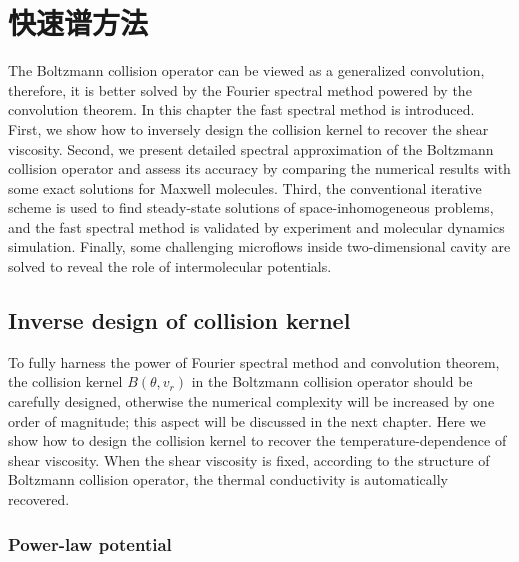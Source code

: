 \chapter{快速谱方法}
\label{chap:single_component}

The Boltzmann collision operator can be viewed as a generalized convolution, therefore, it is better solved by the Fourier spectral method powered by the convolution theorem. In this chapter the fast spectral method is introduced. First, we show how to inversely design the collision kernel to recover the shear viscosity. Second, we present detailed spectral approximation of the Boltzmann collision operator and assess its accuracy by comparing the numerical results with some exact solutions for Maxwell molecules. Third, the conventional iterative scheme is used to find steady-state solutions of space-inhomogeneous problems, and the fast spectral method is validated by experiment and molecular dynamics simulation. Finally, some challenging microflows inside two-dimensional cavity are solved to reveal the role of intermolecular potentials.



\section{Inverse design of collision kernel}
\label{collision_kernel_detailed}

To fully harness the power of Fourier spectral method and convolution theorem, the collision kernel $B(\theta,v_r)$ in the Boltzmann collision operator should be carefully designed, otherwise the numerical complexity will be increased by one order of magnitude; this aspect will be discussed in the next chapter. Here we show how to design the collision kernel to recover the temperature-dependence of shear viscosity. When the shear viscosity is fixed, according to the structure of Boltzmann collision operator, the thermal conductivity is automatically recovered. %


\subsection{Power-law potential}

